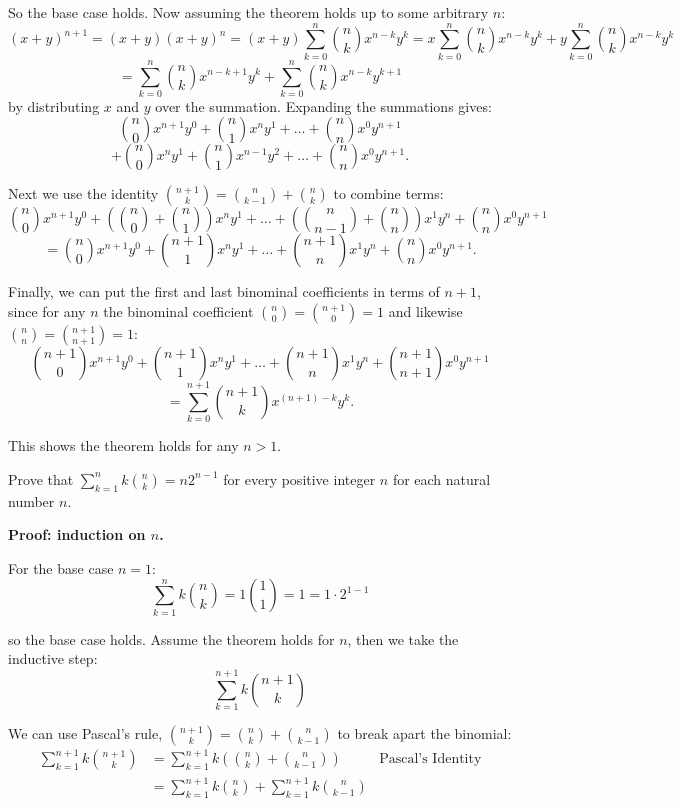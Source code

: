 \documentclass{article}
\begin{document}
So the base case holds. Now assuming the theorem holds up to some arbitrary $n$:
$$(x + y)^{n+1} = (x + y)(x + y)^n = (x + y)\sum_{k=0}^{n} \binom{n}{k}x^{n-k}y^k = x\sum_{k=0}^{n} \binom{n}{k}x^{n-k}y^k + y\sum_{k=0}^{n} \binom{n}{k}x^{n-k}y^k$$
$$=\sum_{k=0}^{n} \binom{n}{k}x^{n-k+1}y^{k} + \sum_{k=0}^{n} \binom{n}{k}x^{n-k}y^{k+1}$$
by distributing $x$ and $y$ over the summation. Expanding the summations gives:
$$\binom{n}{0}x^{n+1}y^0 + \binom{n}{1}x^n y^1 + \ldots + \binom{n}{n}x^0 y^{n+1}$$
$$ + \binom{n}{0}x^n y^1 + \binom{n}{1}x^{n-1}y^2 + \ldots + \binom{n}{n}x^0 y^{n+1}.$$

Next we use the identity $\binom{n+1}{k} = \binom{n}{k-1} + \binom{n}{k}$ to combine terms:
$$\binom{n}{0}x^{n+1}y^0 + \left(\binom{n}{0} + \binom{n}{1}\right)x^n y^1 + \ldots + \left(\binom{n}{n-1} + \binom{n}{n}\right)x^1 y^n + \binom{n}{n}x^0 y^{n+1}$$
$$=\binom{n}{0}x^{n+1}y^0 + \binom{n+1}{1}x^n y^1 + \ldots + \binom{n+1}{n}x^1 y^n + \binom{n}{n}x^0 y^{n+1}.$$

Finally, we can put the first and last binominal coefficients in terms of $n+1$, since for any $n$ the binominal coefficient $\binom{n}{0} = \binom{n+1}{0} = 1$ and likewise $\binom{n}{n} = \binom{n+1}{n+1} = 1$:
$$\binom{n+1}{0}x^{n+1}y^0 + \binom{n+1}{1}x^n y^1 + \ldots + \binom{n+1}{n}x^1 y^n + \binom{n+1}{n+1}x^0 y^{n+1}$$
$$ = \sum_{k=0}^{n+1} \binom{n+1}{k}x^{(n+1)-k}y^k.$$

This shows the theorem holds for any $n > 1$.

\begin{problem}
Prove that $\sum_{k=1}^n k \binom{n}{k} = n2^{n-1}$ for every positive integer $n$ for each natural number $n$.
\end{problem}

\textbf{Proof: induction on $n$.}

For the base case $n = 1$:
$$\sum_{k=1}^n k \binom{n}{k} = 1\binom{1}{1} = 1 = 1\cdot 2^{1-1}$$

so the base case holds. Assume the theorem holds for $n$, then we take the inductive step:
$$\sum_{k=1}^{n+1} k \binom{n+1}{k}$$

We can use Pascal's rule, $\binom{n + 1}{k} = \binom{n}{k} + \binom{n}{k-1}$ to break apart the binomial:
\begin{align*}
    \sum_{k=1}^{n+1} k \binom{n+1}{k} & = \sum_{k=1}^{n+1}k\left(\binom{n}{k} + \binom{n}{k-1}             \right) & \text{Pascal's Identity} \\
                                      & = \sum_{k=1}^{n+1}k\binom{n}{k} + \sum_{k=1}^{n+1} k \binom{n}{k-1}        &                          \\
\end{align*}
\end{document}
